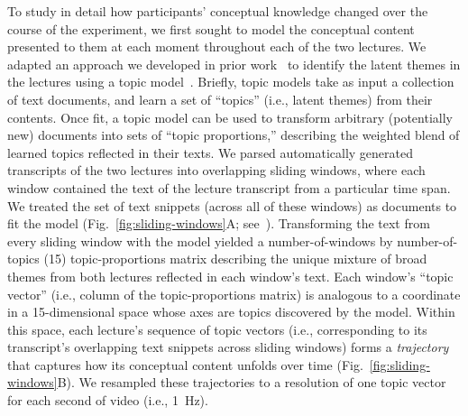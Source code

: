 \documentclass[10pt]{article}
\renewcommand{\nameref}[1]{\mbox{\textit{\oldnameref{#1}}}}
\begin{document}
To study in detail how participants' conceptual knowledge changed over the
course of the experiment, we first sought to model the conceptual content
presented to them at each moment throughout each of the two lectures. We
adapted an approach we developed in prior work~\citep{HeusEtal21} to identify
the latent themes in the lectures using a topic model~\citep{BleiEtal03}.
Briefly, topic models take as input a collection of text documents, and learn a
set of ``topics'' (i.e., latent themes) from their contents. Once fit, a topic
model can be used to transform arbitrary (potentially new) documents into sets
of ``topic proportions,'' describing the weighted blend of learned topics
reflected in their texts. We parsed automatically generated transcripts of the
two lectures into overlapping sliding windows, where each window contained the
text of the lecture transcript from a particular time span. We treated the set
of text snippets (across all of these windows) as documents to fit the model
(Fig.~\ref{fig:sliding-windows}A; see~\nameref{subsec:topic-modeling}).
Transforming the text from every sliding window with the model yielded a
number-of-windows by number-of-topics (15) topic-proportions matrix describing
the unique mixture of broad themes from both lectures reflected in each
window's text. Each window's ``topic vector'' (i.e., column of the
topic-proportions matrix) is analogous to a coordinate in a 15-dimensional
space whose axes are topics discovered by the model. Within this space, each
lecture's sequence of topic vectors (i.e., corresponding to its transcript's
overlapping text snippets across sliding windows) forms a \textit{trajectory}
that captures how its conceptual content unfolds over time
(Fig.~\ref{fig:sliding-windows}B). We resampled these trajectories to a
resolution of one topic vector for each second of video (i.e., 1~Hz).
\end{document}
